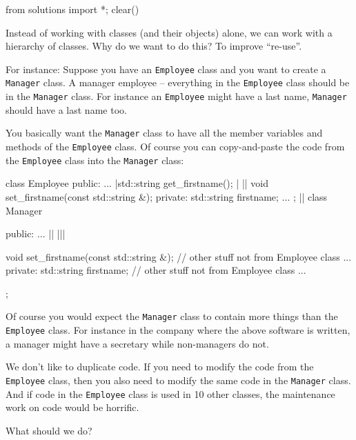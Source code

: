 \begin{python0}
from solutions import *; clear()
\end{python0}

Instead of working with classes (and their objects) alone, we can work
with a hierarchy of classes. Why do we want to do this? To improve
``re-use''.

For instance: Suppose you have an \texttt{Employee} class and you want to create a \texttt{Manager} class. A manager  employee -- everything in the \texttt{Employee} class should be in the \texttt{Manager} class. For instance an \texttt{Employee} might have a last name, \texttt{Manager} should have a last name too.

You basically want the \texttt{Manager} class to have all the member variables and methods of the \texttt{Employee} class. Of course you can copy-and-paste the code from the \texttt{Employee} class into the \texttt{Manager} class:

\begin{consolethree}[escapeinside=||]
class Employee
{
public:
        ...
        |std::string get\_firstname();                |                ||
        void set_firstname(const std::string &);
private:
        std::string firstname;
        ...
};
||
class Manager
{
public:
        ...
        ||                 |||
        
        void set_firstname(const std::string &);
        // other stuff not from Employee class
        ...
private:
        std::string firstname;
        // other stuff not from Employee class
        ...
}; 
\end{consolethree}
Of course you would expect the \texttt{Manager} class to contain more
things than the \texttt{Employee} class. For instance in the company where
the above software is written, a manager might have a secretary while
non-managers do not.

We don't like to duplicate code. If you need to modify the code from the
\texttt{Employee} class, then you also need to modify the same code in the
\texttt{Manager} class. And if code in the \texttt{Employee} class is used
in 10 other classes, the maintenance work on code would be horrific.

What should we do?

